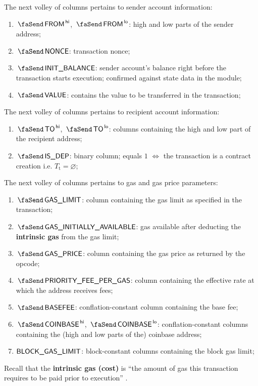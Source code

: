 The next volley of columns pertains to sender account information:
\begin{enumerate}[resume]
	\item $\txFrom\high$, $\txFrom\low$:
		\markAsExtractedFromEcrecover{}
		high and low parts of the sender address;
	\item $\txNonce$:
		\markAsExtractedFromRlpTxn{}
		transaction nonce;
	\item $\txInitialBalance$:
		\markAsExtractedFromHub{}
		\godGiven{}
		sender account's balance right before the transaction starts execution; confirmed against state data in the \hubMod{} module;
	\item $\txValue$:
		\markAsExtractedFromRlpTxn{}
		contains the value to be transferred in the transaction;
\end{enumerate}
The next volley of columns pertains to recipient account information:
\begin{enumerate}[resume]
	\item $\txTo\high$, $\txTo\low$:
		\markAsSometimesExtractedFromRlpTxn{}
		columns containing the high and low part of the recipient address;
	\item $\txIsDeployment$:
		\markAsExtractedFromRlpTxn{}
		binary column; equals $1$ $\iff$ the transaction is a contract creation i.e. $T_\text{t} = \varnothing$;
\end{enumerate}
The next volley of columns pertains to gas and gas price parameters: 
\begin{enumerate}[resume]
	\item $\txGasLimit$:
		\markAsExtractedFromRlpTxn{}
		column containing the gas limit as specified in the transaction;
	\item $\txInitialGas$:
		\markAsComputedHere{}
		gas available after deducting the \textbf{intrinsic gas} from the gas limit;
	\item $\txGasPrice$:
		\markAsComputedHere{}
		column containing the gas price as returned by the  opcode;
	\item $\txPriorityFeePerGas$:
		\markAsComputedHere{}
		column containing the effective rate at which the  address receives fees;
	\item $\txBasefee$:
		\markAsExtractedFromBtc{}
		conflation-constant column containing the base fee;
	\item $\txCoinbase\high$, $\txCoinbase\low$:
		\markAsExtractedFromBtc{}
		conflation-constant columns containing the (high and low parts of the) coinbase address;
	\item $\textsf{BLOCK\_GAS\_LIMIT}$:
		\markAsExtractedFromBtc{}
		block-constant columns containing the block gas limit;
\end{enumerate}
Recall that the \textbf{intrinsic gas (cost)} is ``the amount of gas this transaction requires to be paid prior to execution'' .

